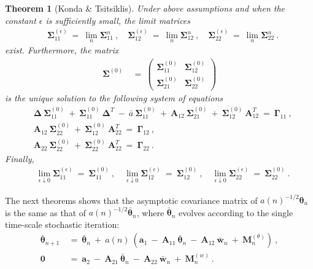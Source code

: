 \documentclass{article}
\newtheorem{theorem}{Theorem}
\newcommand\Ba{\bm{a}}
\newcommand\Bw{\bm{w}}
\newcommand\BA{\bm{A}}
\newcommand\BM{\bm{M}}
\newcommand\Bth{\bm{\theta}}
\newcommand\BDe{\bm{\Delta}}
\newcommand\BSi{\bm{\Sigma}}
\newcommand\BGa{\bm{\Gamma}}
\newcommand\BZe{\bm{0}}
\begin{document}
\begin{theorem}[Konda \& Tsitsiklis]
\label{th:kondaRate}
Under above assumptions and when the constant $\epsilon$ is
sufficiently small, the limit matrices
\begin{align}
& \BSi_{11}^{(\epsilon)} \ = \ \lim_{n} \BSi_{11}^n \ , \quad
\BSi_{12}^{(\epsilon)} \ = \ \lim_{n} \BSi_{12}^n \ , \quad
\BSi_{22}^{(\epsilon)} \ = \ \lim_{n} \BSi_{22}^n \ .
\end{align}
exist. Furthermore, the matrix
\begin{align}
\BSi^{(0)} \ &= \
\begin{pmatrix}
\BSi_{11}^{(0)} & \BSi_{12}^{(0)} \\
\BSi_{21}^{(0)} & \BSi_{22}^{(0)}
\end{pmatrix}
\end{align}
is the unique solution to the following system of equations
\begin{align}
&\BDe \ \BSi_{11}^{(0)} \ + \ \BSi_{11}^{(0)} \ \BDe^{T} \ - \ \bar{a}
  \ \BSi_{11}^{(0)} \ + \ \BA_{12} \   \BSi_{21}^{(0)}
 \ + \  \BSi_{12}^{(0)} \ \BA_{12}^{T} \ = \ \BGa_{11} \ , \\
& \BA_{12} \   \BSi_{22}^{(0)}
 \ + \  \BSi_{12}^{(0)} \ \BA_{22}^{T} \ = \ \BGa_{12} \ , \\
& \BA_{22} \   \BSi_{22}^{(0)}
 \ + \  \BSi_{22}^{(0)} \ \BA_{22}^{T} \ = \ \BGa_{22} \ .
\end{align}
Finally,
\begin{align}
& \lim_{\epsilon \downarrow 0}  \BSi_{11}^{(\epsilon)} \ = \
  \BSi_{11}^{(0)} \ , \quad
\lim_{\epsilon \downarrow 0}  \BSi_{12}^{(\epsilon)} \ = \
  \BSi_{12}^{(0)} \ , \quad
\lim_{\epsilon \downarrow 0}  \BSi_{22}^{(\epsilon)} \ = \
  \BSi_{22}^{(0)} \ .
\end{align}

\end{theorem}

The next theorems shows that the asymptotic covariance matrix of
$a(n)^{-1/2}\Bth_n$ is the same as
that of $a(n)^{-1/2}\bar{\Bth}_n$, where
$\bar{\Bth}_n$
evolves according to the single time-scale stochastic
iteration:
\begin{align}
\bar{\Bth}_{n+1} \ &= \ \bar{\Bth}_n \ + \ a(n) \ \left(\Ba_1 \ - \ \BA_{11} \
               \bar{\Bth}_n \ - \ \BA_{12} \ \bar{\Bw}_n \ + \ \BM^{(\theta)}_{n}\right) \ ,\\
\BZe\ &= \ \Ba_2  \ - \ \BA_{21} \
               \bar{\Bth}_n \ - \ \BA_{22} \ \bar{\Bw}_n \ + \ \BM^{(w)}_{n}\ .
\end{align}
\end{document}
